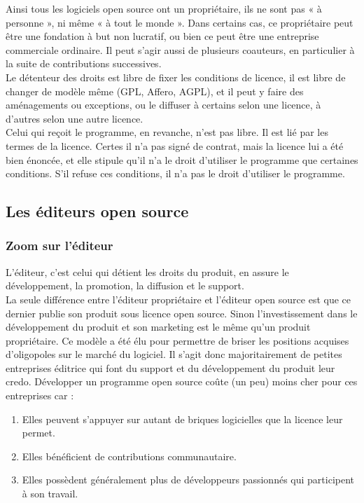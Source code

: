 					Ainsi tous les logiciels open source ont un propriétaire, ils ne sont pas « à personne », ni même « à tout le monde ». Dans certains cas, ce propriétaire peut être une fondation à but non lucratif, ou bien ce peut être une entreprise commerciale ordinaire. Il peut s'agir aussi de plusieurs coauteurs, en particulier à la suite de contributions successives.\\

					Le détenteur des droits est libre de fixer les conditions de licence, il est libre de changer de modèle même (GPL, Affero, AGPL), et il peut y faire des aménagements ou exceptions, ou le diffuser à certains selon une licence, à d'autres selon une autre licence.\\

					Celui qui reçoit le programme, en revanche, n'est pas libre. Il est lié par les termes de la licence. Certes il n'a pas signé de contrat, mais la licence lui a été bien énoncée, et elle stipule qu'il n'a le droit d'utiliser le programme que certaines conditions. S'il refuse ces conditions, il n'a pas le droit d'utiliser le programme. 
					
		\subsection{Les éditeurs open source}

			\subsubsection{Zoom sur l'éditeur}

				L'éditeur, c'est celui qui détient les droits du produit, en assure le développement, la promotion, la diffusion et le support.\\
			
				La seule différence entre l'éditeur propriétaire et l'éditeur open source est que ce dernier publie son produit sous licence open source. Sinon l'investissement dans le développement du produit et son marketing est le même qu'un produit propriétaire.
				Ce modèle a été élu pour permettre de briser les positions acquises d'oligopoles sur le marché du logiciel.
				Il s'agit donc majoritairement de petites entreprises éditrice qui font du support et du développement du produit leur credo.
				Développer un programme open source coûte (un peu) moins cher pour ces entreprises car :

				\begin{enumerate}[font=\color{burntorange}]
		 			\item Elles peuvent s'appuyer sur autant de briques logicielles que la licence leur permet.
		 			\item Elles bénéficient de contributions communautaire.
			 		\item Elles possèdent généralement plus de développeurs passionnés qui participent à son travail.
				\end{enumerate}

